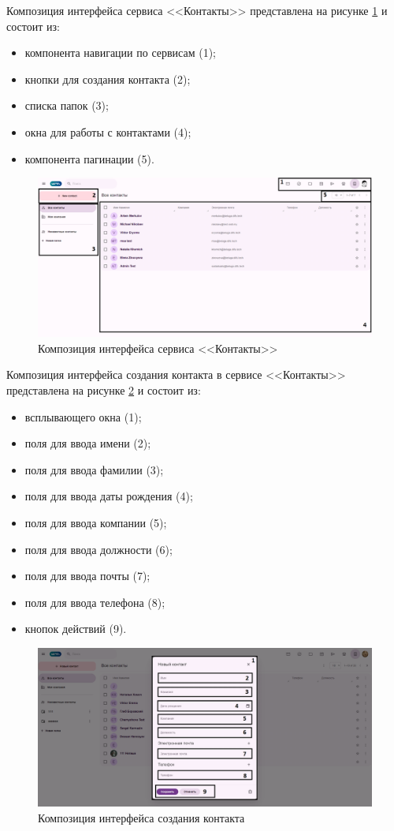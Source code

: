 Композиция интерфейса сервиса <<Контакты>> представлена на рисунке \ref{templ:image5} и состоит из:
\begin{itemize}
  \item компонента навигации по сервисам (1);
  \item кнопки для создания контакта (2);
  \item списка папок (3);
  \item окна для работы с контактами (4);
  \item компонента пагинации (5).
\end{itemize}
\begin{figure}[H]
	\centering
	\includegraphics[width=1\linewidth]{images/контакты}
	\caption{Композиция интерфейса сервиса <<Контакты>>}
	\label{templ:image5}
\end{figure}

Композиция интерфейса создания контакта в сервисе <<Контакты>> представлена на рисунке \ref{templ:image5b} и состоит из:
\begin{itemize}
  \item всплывающего окна (1);
  \item поля для ввода имени (2);
  \item поля для ввода фамилии (3);
  \item поля для ввода даты рождения (4);
  \item поля для ввода компании (5);
  \item поля для ввода должности (6);
  \item поля для ввода почты (7);
  \item поля для ввода телефона (8);
  \item кнопок действий (9).
\end{itemize}
\begin{figure}[H]
	\centering
	\includegraphics[width=1\linewidth]{images/контакты2}
	\caption{Композиция интерфейса создания контакта}
	\label{templ:image5b}
\end{figure}

